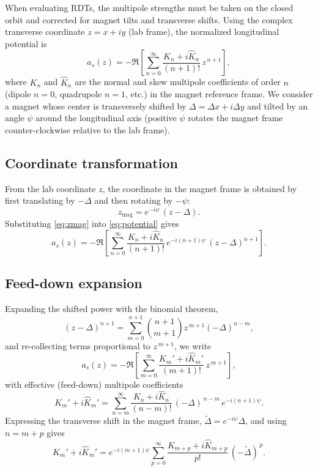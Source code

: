 When evaluating RDTs, the multipole strengths must be taken on the closed orbit and corrected for magnet tilts and transverse shifts. Using the complex transverse coordinate \(z = x + i y\) (lab frame), the normalized longitudinal potential is
\begin{equation}
  a_s(z) = - \Re \left[ \sum_{n=0}^{\infty} \frac{K_n + i \hat K_n}{(n+1)!} \, z^{\,n+1} \right],
  \label{eq:potential}
\end{equation}
where \(K_n\) and \(\hat K_n\) are the normal and skew multipole coefficients of order \(n\) (dipole \(n=0\), quadrupole \(n=1\), etc.) in the magnet reference frame. We consider a magnet whose center is transversely shifted by \(\Delta = \Delta x + i \Delta y\) and tilted by an angle \(\psi\) around the longitudinal axis (positive \(\psi\) rotates the magnet frame counter-clockwise relative to the lab frame).

\subsection{Coordinate transformation}
From the lab coordinate \(z\), the coordinate in the magnet frame is obtained by first translating by \(-\Delta\) and then rotating by \(-\psi\):
\begin{equation}
  z_{\mathrm{mag}} = e^{-i\psi}\,(z - \Delta).
  \label{eq:zmag}
\end{equation}
Substituting \eqref{eq:zmag} into \eqref{eq:potential} gives
\begin{equation}
  a_s(z) = - \Re \left[ \sum_{n=0}^{\infty} \frac{K_n + i \hat K_n}{(n+1)!} \, e^{-i (n+1)\psi}\, (z - \Delta)^{n+1} \right].
  \label{eq:potential_transformed}
\end{equation}

\subsection{Feed-down expansion}
Expanding the shifted power with the binomial theorem,
\begin{equation}
  (z - \Delta)^{n+1} = \sum_{m=0}^{n+1} \binom{n+1}{m+1} z^{\,m+1} (-\Delta)^{n-m},
\end{equation}
and re-collecting terms proportional to \(z^{\,m+1}\), we write
\begin{equation}
  a_s(z) = - \Re \left[ \sum_{m=0}^{\infty} \frac{K_m' + i \hat K_m'}{(m+1)!} \, z^{\,m+1} \right],
  \label{eq:potential_effective}
\end{equation}
with effective (feed-down) multipole coefficients
\begin{equation}
  K_m' + i \hat K_m' = \sum_{n=m}^{\infty} \frac{K_n + i \hat K_n}{(n-m)!} \, (-\Delta)^{\,n-m} \, e^{-i (n+1)\psi}.
  \label{eq:feeddown_raw}
\end{equation}
Expressing the transverse shift in the magnet frame, \(\tilde\Delta = e^{-i\psi} \Delta\), and using \(n = m + p\) gives
\begin{equation}
  K_m' + i \hat K_m' = e^{-i (m+1)\psi} \sum_{p=0}^{\infty} \frac{K_{m+p} + i \hat K_{m+p}}{p!} \, (-\tilde\Delta)^{\,p}.
  \label{eq:feeddown_final}
\end{equation}

